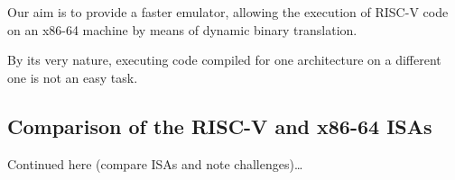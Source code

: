Our aim is to provide a faster emulator, allowing the execution of RISC-V code on an x86-64 machine by means of dynamic binary translation.

By its very nature, executing code compiled for one architecture on a different one is not an easy task.


\subsection{Comparison of the RISC-V and x86-64 ISAs}
\label{sec:isa-cmp}

Continued here (compare ISAs and note challenges)\ldots













